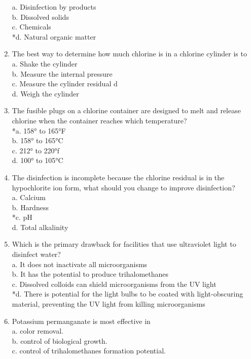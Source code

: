 \begin{enumerate}[1.]
a.  Disinfection by products\\
b.  Dissolved solids\\
c.  Chemicals\\
*d.  Natural organic matter\\
\item The best way to determine how much chlorine is in a chlorine cylinder is to\\
a.  Shake the cylinder\\
b.  Measure the internal pressure\\
c. Measure the cylinder residual  d\\
d.  Weigh the cylinder\\
\item The fusible plugs on a chlorine container are designed to melt and release chlorine when the container reaches which temperature?\\
*a.  158° to 165°F\\
b.  158° to 165°C\\
c.  212° to 220°f\\
d.  100° to 105°C\\
\item The disinfection is incomplete because the chlorine residual is in the hypochlorite ion form, what should you change to improve disinfection?\\
a.  Calcium\\
b.  Hardness\\
*c.  pH\\
d. Total alkalinity\\
\item Which is the primary drawback for facilities that use ultraviolet light to disinfect water?\\
a. It does not inactivate all microorganisms\\
b. It has the potential to produce trihalomethanes\\
c. Dissolved colloids can shield microorganisms from the UV light\\
*d. There is potential for the light bulbs to be coated with light-obscuring material, preventing the UV light from killing microorganisms \\
\item Potassium permanganate is most effective in\\
a. color removal.\\
b. control of biological growth.\\
c. control of trihalomethanes formation potential.\\

\end{enumerate}
